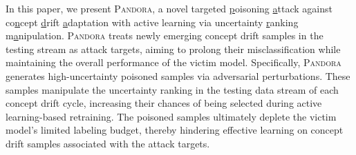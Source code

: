 \documentclass[lettersize,journal]{IEEEtran}
\newcommand{\pandora}{{\scshape Pandora}\xspace}
\begin{document}
In this paper, we present \pandora, a novel targeted \underline{p}oisoning \underline{a}ttack against co\underline{n}cept \underline{d}rift \underline{a}daptation with active learning via uncertainty \underline{r}anking m\underline{a}nipulation.
\pandora treats newly emerging concept drift samples in the testing stream as attack targets, aiming to prolong their misclassification while maintaining the overall performance of the victim model.
Specifically, \pandora generates high-uncertainty poisoned samples via adversarial perturbations.
These samples manipulate the uncertainty ranking in the testing data stream of each concept drift cycle, increasing their chances of being selected during active learning-based retraining.
The poisoned samples ultimately deplete the victim model’s limited labeling budget, thereby hindering effective learning on concept drift samples associated with the attack targets.

\end{document}
